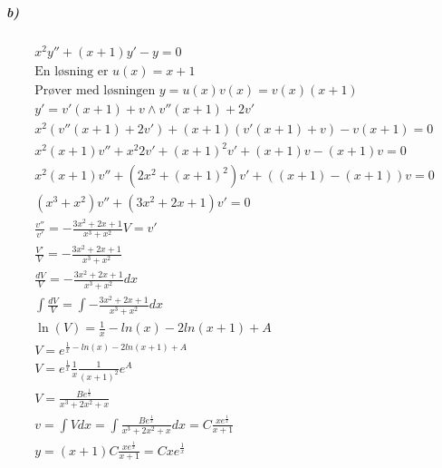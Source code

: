 \documentclass[11pt, A4paper,norsk]{article}
\begin{document}
			\subparagraph{b)}
				\begin{gather*}
x^2 y'' + (x + 1)y' - y = 0 \\
\text{En løsning er $u(x) = x + 1$} \\
\text{Prøver med løsningen $y = u(x)v(x) = v(x)(x + 1)$} \\
y' = v'(x + 1) + v \wedge v''(x + 1) + 2v' \\
x^2 (v''(x + 1) + 2v') + (x + 1)(v'(x + 1) + v) - v(x + 1) = 0 \\
x^2(x + 1) v'' + x^2 2 v' + (x + 1)^2 v' + (x + 1) v - (x + 1)v = 0 \\
x^2(x + 1) v'' + ( 2 x^2 + (x + 1)^2 ) v' + ( (x + 1) - (x + 1) ) v = 0 \\
( x^3 + x^2 ) v'' + ( 3 x^2 + 2x + 1 ) v' = 0 \\
\frac{v''}{v'} = - \frac{3 x^2 + 2x + 1}{x^3 + x^2}
V = v' \\
\frac{V'}{V} = - \frac{3 x^2 + 2x + 1}{x^3 + x^2} \\
\frac{dV}{V} = - \frac{3 x^2 + 2x + 1}{x^3 + x^2} dx \\
\int \frac{dV}{V} = \int - \frac{3 x^2 + 2x + 1}{x^3 + x^2} dx \\
\ln(V) = \frac{1}{x} - ln(x) - 2ln(x + 1) + A \\
V = e^{\frac{1}{x} - ln(x) - 2ln(x + 1) + A} \\
V = e^{\frac{1}{x}} \frac{1}{x} \frac{1}{(x + 1)^2} e^{A} \\
V = \frac{B e^{\frac{1}{x}}}{x^3 + 2x^2 + x} \\
v = \int V dx = \int \frac{B e^{\frac{1}{x}}}{x^3 + 2x^2 + x} dx = C \frac{x e^{\frac{1}{x}}}{x + 1} \\
y = (x + 1) C \frac{x e^{\frac{1}{x}}}{x + 1} = C x e^{\frac{1}{x}}
				\end{gather*}
\end{document}
